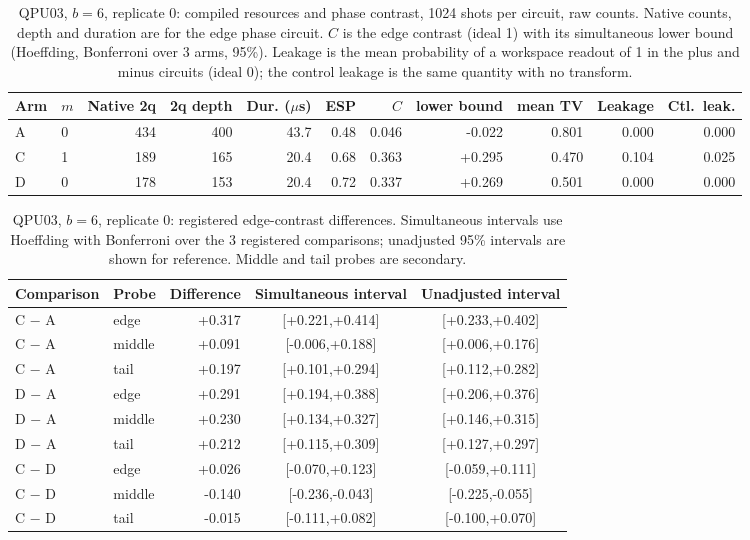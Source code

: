 \begin{table}[htbp]\centering\scriptsize\setlength{\tabcolsep}{3pt}
\caption{QPU03, $b=6$, replicate 0: compiled resources and phase contrast, 1024 shots per circuit, raw counts. Native counts, depth and duration are for the edge phase circuit. $C$ is the edge contrast (ideal 1) with its simultaneous lower bound (Hoeffding, Bonferroni over 3 arms, 95\%). Leakage is the mean probability of a workspace readout of 1 in the plus and minus circuits (ideal 0); the control leakage is the same quantity with no transform.}\label{tab:q3-b6r0}
\begin{tabular}{llrrrrrrrrr}\toprule Arm & $m$ & Native 2q & 2q depth & Dur. ($\mu$s) & ESP & $C$ & lower bound & mean TV & Leakage & Ctl.\ leak.\\\midrule
A & 0 & 434 & 400 & 43.7 & 0.48 & 0.046 & -0.022 & 0.801 & 0.000 & 0.000\\
C & 1 & 189 & 165 & 20.4 & 0.68 & 0.363 & +0.295 & 0.470 & 0.104 & 0.025\\
D & 0 & 178 & 153 & 20.4 & 0.72 & 0.337 & +0.269 & 0.501 & 0.000 & 0.000\\
\bottomrule\end{tabular}\end{table}

\begin{table}[htbp]\centering\scriptsize\setlength{\tabcolsep}{3pt}
\caption{QPU03, $b=6$, replicate 0: registered edge-contrast differences. Simultaneous intervals use Hoeffding with Bonferroni over the 3 registered comparisons; unadjusted 95\% intervals are shown for reference. Middle and tail probes are secondary.}\label{tab:q3d-b6r0}
\begin{tabular}{llrcc}\toprule Comparison & Probe & Difference & Simultaneous interval & Unadjusted interval\\\midrule
C $-$ A & edge & +0.317 & [+0.221,+0.414] & [+0.233,+0.402]\\
C $-$ A & middle & +0.091 & [-0.006,+0.188] & [+0.006,+0.176]\\
C $-$ A & tail & +0.197 & [+0.101,+0.294] & [+0.112,+0.282]\\
D $-$ A & edge & +0.291 & [+0.194,+0.388] & [+0.206,+0.376]\\
D $-$ A & middle & +0.230 & [+0.134,+0.327] & [+0.146,+0.315]\\
D $-$ A & tail & +0.212 & [+0.115,+0.309] & [+0.127,+0.297]\\
C $-$ D & edge & +0.026 & [-0.070,+0.123] & [-0.059,+0.111]\\
C $-$ D & middle & -0.140 & [-0.236,-0.043] & [-0.225,-0.055]\\
C $-$ D & tail & -0.015 & [-0.111,+0.082] & [-0.100,+0.070]\\
\bottomrule\end{tabular}\end{table}

